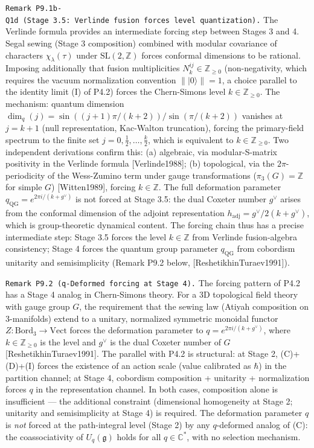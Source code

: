 \documentclass[
]{article}
\begin{document}
\texttt{Remark\ P9.1b-Q1d\ (Stage\ 3.5:\ Verlinde\ fusion\ forces\ level\ quantization).}
The Verlinde formula provides an intermediate forcing step between
Stages 3 and 4. Segal sewing (Stage 3 composition) combined with modular
covariance of characters \(\chi_\lambda(\tau)\) under
\(\mathrm{SL}(2,\mathbb{Z})\) forces conformal dimensions to be
rational. Imposing additionally that fusion multiplicities
\(N^{ij}_k \in \mathbb{Z}_{\geq 0}\) (non-negativity, which requires the
vacuum normalization convention \(\lVert\lvert 0\rangle\rVert = 1\), a
choice parallel to the identity limit (I) of P4.2) forces the
Chern-Simons level \(k \in \mathbb{Z}_{\geq 0}\). The mechanism: quantum
dimension \(\dim_q(j) = \sin((j+1)\pi/(k+2))/\sin(\pi/(k+2))\) vanishes
at \(j = k+1\) (null representation, Kac-Walton truncation), forcing the
primary-field spectrum to the finite set
\(j = 0, \tfrac{1}{2}, \ldots, \tfrac{k}{2}\), which is equivalent to
\(k \in \mathbb{Z}_{\geq 0}\). Two independent derivations confirm this:
(a) algebraic, via modular-S-matrix positivity in the Verlinde formula
{[}Verlinde1988{]}; (b) topological, via the \(2\pi\)-periodicity of the
Wess-Zumino term under gauge transformations (\(\pi_3(G) = \mathbb{Z}\)
for simple \(G\)) {[}Witten1989{]}, forcing \(k \in \mathbb{Z}\). The
full deformation parameter \(q_{\mathrm{QG}} = e^{2\pi i/(k+g^\vee)}\)
is not forced at Stage 3.5: the dual Coxeter number \(g^\vee\) arises
from the conformal dimension of the adjoint representation
\(h_{\mathrm{adj}} = g^\vee / 2(k+g^\vee)\), which is group-theoretic
dynamical content. The forcing chain thus has a precise intermediate
step: Stage 3.5 forces the level \(k \in \mathbb{Z}\) from Verlinde
fusion-algebra consistency; Stage 4 forces the quantum group parameter
\(q_{\mathrm{QG}}\) from cobordism unitarity and semisimplicity (Remark
P9.2 below, {[}ReshetikhinTuraev1991{]}).

\texttt{Remark\ P9.2\ (q-Deformed\ forcing\ at\ Stage\ 4).} The forcing
pattern of P4.2 has a Stage 4 analog in Chern-Simons theory. For a 3D
topological field theory with gauge group \(G\), the requirement that
the sewing law (Atiyah composition on 3-manifolds) extend to a unitary,
normalized symmetric monoidal functor
\(Z\colon \mathrm{Bord}_3 \to \mathrm{Vect}\) forces the deformation
parameter to \(q = e^{2\pi i/(k+g^\vee)}\), where
\(k \in \mathbb{Z}_{\geq 0}\) is the level and \(g^\vee\) is the dual
Coxeter number of \(G\) {[}ReshetikhinTuraev1991{]}. The parallel with
P4.2 is structural: at Stage 2, (C)+(D)+(I) forces the existence of an
action scale (value calibrated as \(\hbar\)) in the partition channel;
at Stage 4, cobordism composition + unitarity + normalization forces
\(q\) in the representation channel. In both cases, composition alone is
insufficient --- the additional constraint (dimensional homogeneity at
Stage 2; unitarity and semisimplicity at Stage 4) is required. The
deformation parameter \(q\) is \emph{not} forced at the path-integral
level (Stage 2) by any \(q\)-deformed analog of (C): the coassociativity
of \(U_q(\mathfrak{g})\) holds for all \(q \in \mathbb{C}^*\), with no
selection mechanism.
\end{document}

